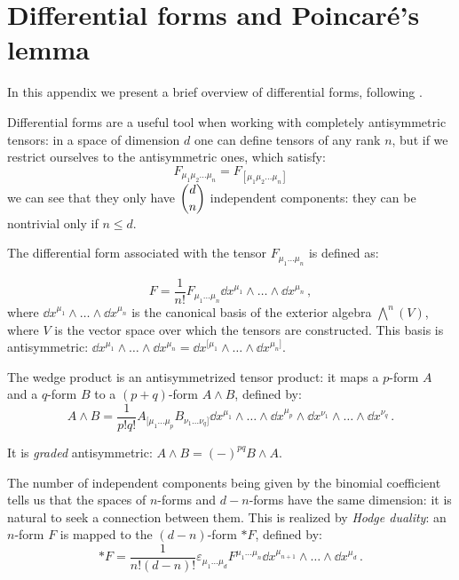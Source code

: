\documentclass[main.tex]{subfiles}
\begin{document}
\clearpage
\appendix

\section{Differential forms and Poincaré's lemma} \label{sec:differential-forms}

In this appendix we present a brief overview of differential forms, following \cite{Lechner}.

Differential forms are a useful tool when working with completely antisymmetric tensors:
in a space of dimension \(d\) one can define tensors of any rank \(n\), but if we restrict ourselves to the antisymmetric ones, which satisfy:
%
\begin{equation}
  F_{\mu_1 \mu_2 \dots \mu_{n}} 
 = F_{[\mu_1 \mu_2 \dots \mu_{n}]}
\end{equation}
%
we can see that they only have \(\dbinom{d}{n}\) independent components: they can be nontrivial only if \(n \leq d\).  

The differential form associated with the tensor \(F_{\mu_1 \dots \mu_{n}}\) is defined as:

\begin{equation}
  F = \frac{1}{n!} F_{\mu_1 \dots \mu_{n}} \dd{x^{\mu_1}} \wedge \dots \wedge \dd{x^{\mu_n}}\,,
\end{equation}
%
where \(\dd{x^{\mu_1}} \wedge \dots \wedge \dd{x^{\mu_n}}\) is the canonical basis of the exterior algebra \(\bigwedge^n (V)\), where \(V\) is the vector space over which the tensors are constructed.
This basis is antisymmetric: \(\dd{x^{\mu_1}} \wedge \dots \wedge \dd{x^{\mu_n}} = \dd{x^{[\mu_1}} \wedge \dots \wedge \dd{x^{\mu_n]}}\).

The wedge product is an antisymmetrized tensor product: it maps a \(p\)-form \(A\) and a \(q\)-form \(B\) to a \((p+q)\)-form \(A \wedge B\), defined by:
\begin{equation}
  A \wedge B = \frac{1}{p!q!} 
  A_{[\mu_1 \dots \mu_{p}} B_{\nu_1 \dots \nu_{q}]}
  \dd{x^{\mu_1}} \wedge \dots \wedge \dd{x^{\mu_p}} \wedge
  \dd{x^{\nu_1}} \wedge \dots \wedge \dd{x^{\nu_q}}\,.
\end{equation}

It is \emph{graded} antisymmetric: \(A \wedge B = (-)^{pq} B \wedge A\).

The number of independent components being given by the binomial coefficient tells us that the spaces of \(n\)-forms and \(d-n\)-forms have the same dimension: it is natural to seek a connection between them. This is realized by \emph{Hodge duality}: an \(n\)-form \(F\) is mapped to the \((d-n)\)-form \(*F\), defined by:
\begin{equation}
  *F = 
  \frac{1}{n!(d-n)!} \varepsilon_{\mu_1 \dots \mu_d} F^{\mu_1 \dots \mu_n} \dd{x^{\mu_{n+1}}} \wedge \dots \wedge \dd{x^{\mu_{d}}}\,.
\end{equation}
\end{document}

